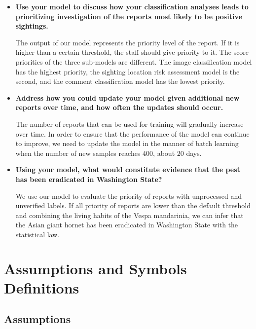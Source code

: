 \documentclass{mcmthesis}
\numberwithin{figure}{section}
\numberwithin{table}{section}
\begin{document}
\begin{itemize}
  \item \textbf{Use your model to discuss how your classification analyses leads to prioritizing investigation of the reports most likely to be positive sightings.}

The output of our model represents the priority level of the report. If it is higher than a certain threshold, the staff should give priority to it. The score priorities of the three sub-models are different. The image classification model has the highest priority, the sighting location risk assessment model is the second, and the comment classification model has the lowest priority.

  \item \textbf{Address how you could update your model given additional new reports over time, and how often the updates should occur.}
  
The number of reports that can be used for training will gradually increase over time. In order to ensure that the performance of the model can continue to improve, we need to update the model in the manner of batch learning when the number of new samples reaches 400, about 20 days.

  \item \textbf{Using your model, what would constitute evidence that the pest has been eradicated in Washington State?}

We use our model to evaluate the priority of reports with unprocessed and unverified labels. If all priority of reports are lower than the default threshold and combining the living habits of the Vespa mandarinia, we can infer that the Asian giant hornet has been eradicated in Washington State with the statistical law.

\end{itemize}


\section{Assumptions and Symbols Definitions}
\subsection{Assumptions}
\end{document}
